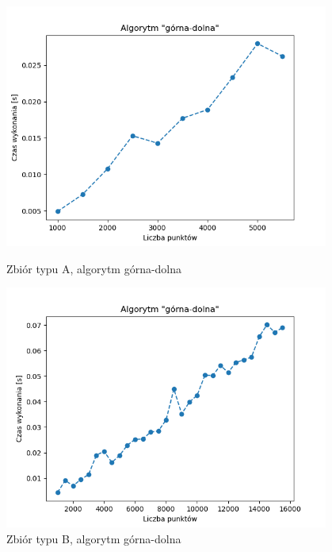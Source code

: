 \documentclass[11pt]{article}
\theoremstyle{remark} \newtheorem{definition}{def.}
\theoremstyle{definition} \newtheorem{twierdzenie}{tw.}
\begin{document}
\begin{figure}[]
    \centering
    \begin{minipage}{0.48\textwidth}
        \centering
        \includegraphics[width=0.95\textwidth]{../tests/chmura-lowerupper.png} %
        \caption{Zbiór typu A, algorytm górna-dolna}
        \label{fig:chmura-lowerupper}
    \end{minipage}\hfill
    \begin{minipage}{0.48\textwidth}
        \centering
        \includegraphics[width=0.95\textwidth]{../tests/okrag-lowerupper.png} %
        \caption{Zbiór typu B, algorytm górna-dolna}
        \label{fig:okrag-lowerupper}
    \end{minipage}
\end{figure}
\end{document}
